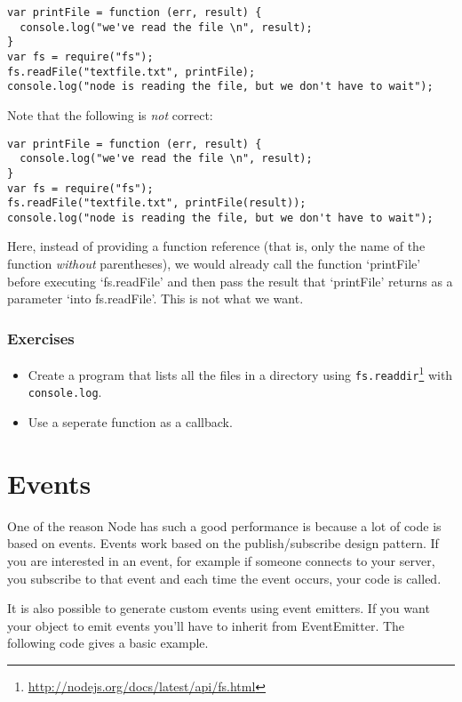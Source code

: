 \documentclass[a4paper]{report}
\begin{document}
\begin{lstlisting} 
var printFile = function (err, result) {
  console.log("we've read the file \n", result);
}
var fs = require("fs");
fs.readFile("textfile.txt", printFile);
console.log("node is reading the file, but we don't have to wait");
\end{lstlisting} 
 
\noindent Note that the following is \emph{not} correct: 
 
\begin{lstlisting} 
var printFile = function (err, result) {
  console.log("we've read the file \n", result);
}
var fs = require("fs");
fs.readFile("textfile.txt", printFile(result));
console.log("node is reading the file, but we don't have to wait");
\end{lstlisting} 
 
\noindent Here, instead of providing a function reference (that is, only the name of the function \emph{without} parentheses), we would already call the function `printFile' before executing `fs.readFile' and then pass the result that `printFile' returns as a parameter `into fs.readFile'. This is not what we want. 
 
\subsubsection*{Exercises} 
\begin{itemize} 
	\item Create a program that lists all the files in a directory using \texttt{fs.readdir}\footnote{\url{http://nodejs.org/docs/latest/api/fs.html}} with \texttt{console.log}. 
	\item Use a seperate function as a callback. 
\end{itemize} 
 
\section*{Events} 
One of the reason Node has such a good performance is because a lot of code is based on events. Events work based on the publish/subscribe design pattern. If you are interested in an event, for example if someone connects to your server, you subscribe to that event and each time the event occurs, your code is called. 
 
 
 
\noindent It is also possible to generate custom events using event emitters. If you want your object to emit events you'll have to inherit from EventEmitter. The following code gives a basic example. 
 
\end{document}
